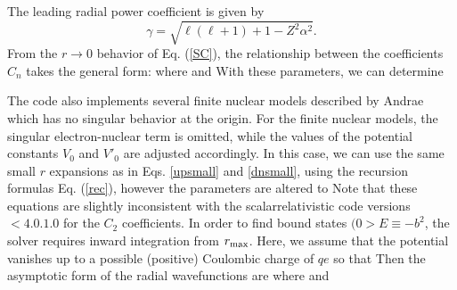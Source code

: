 \documentclass[11pt]{article}
\begin{document}
The leading radial power coefficient is given by
\begin{equation}
\gamma= \sqrt{ \ell(\ell+1) + 1 -Z^2 \alpha^2 }.
\end{equation}
From the $r \rightarrow 0$ behavior of Eq. (\ref{SC}), the
relationship between the coefficients $C_n$
takes the general form:
where
and
With these parameters, we can determine

The code also implements several finite
nuclear models described by Andrae\cite{andrae:2000} which has no
singular behavior at the origin.   
For the finite nuclear models, the singular electron-nuclear term is 
omitted, while the values of the potential constants $V_0$ and $V'_0$ 
are adjusted accordingly.  In this case, we can use the same small $r$
expansions as in Eqs. \ref{upsmall} and \ref{dnsmall}, using
the recursion formulas Eq. (\ref{rec}), however the
parameters are altered to 
Note that these equations are slightly inconsistent with the
scalarrelativistic code versions $< 4.0.1.0$ for the $C_2$ coefficients.
In order to find bound states $(0 > E \equiv -b^2$, the solver requires
inward integration  from $r_{\rm max}$.   Here, we assume that the
potential vanishes up to a possible (positive) Coulombic charge of $qe$
so that
Then the asymptotic form of the radial wavefunctions are
where
and
\end{document}
